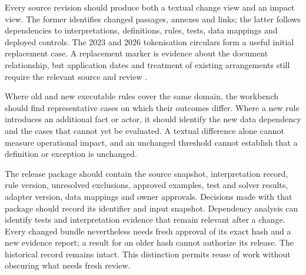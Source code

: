 Every source revision should produce both a textual change view and an impact
view. The former identifies changed passages, annexes and links; the latter
follows dependencies to interpretations, definitions, rules, tests, data mappings
and deployed controls. The 2023 and 2026 tokenisation circulars form a useful
initial replacement case. A replacement marker is evidence about the document
relationship, but application dates and treatment of existing arrangements still
require the relevant source and review \citep{sfctoken2023,sfctoken2026}.

Where old and new executable rules cover the same domain, the workbench should
find representative cases on which their outcomes differ. Where a new rule
introduces an additional fact or actor, it should identify the new data dependency
and the cases that cannot yet be evaluated. A textual difference alone cannot
measure operational impact, and an unchanged threshold cannot establish that a
definition or exception is unchanged.

The release package should contain the source snapshot, interpretation record,
rule version, unresolved exclusions, approved examples, test and solver results,
adapter version, data mappings and owner approvals. Decisions made with that
package should record its identifier and input snapshot. Dependency analysis can
identify tests and interpretation evidence that remain relevant after a change.
Every changed bundle nevertheless needs fresh approval of its exact hash and a
new evidence report; a result for an older hash cannot authorize its release.
The historical record remains intact. This distinction permits reuse of work
without obscuring what needs fresh review.
